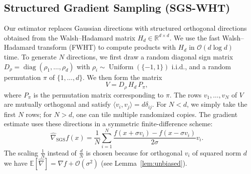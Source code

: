 \documentclass[11pt,a4paper]{article}
\begin{document}
\subsection{Structured Gradient Sampling (SGS-WHT)}
Our estimator replaces Gaussian directions with structured orthogonal directions obtained from the Walsh–Hadamard matrix $H_d \in \mathbb{R}^{d \times d}$. We use the fast Walsh–Hadamard transform (FWHT) to compute products with $H_d$ in $\mathcal{O}(d \log d)$ time. To generate $N$ directions, we first draw a random diagonal sign matrix $D_\rho = \operatorname{diag}(\rho_1,\dots,\rho_d)$ with $\rho_i \sim \operatorname{Uniform}(\{-1,1\})$ i.i.d., and a random permutation $\pi$ of $\{1,\dots,d\}$. We then form the matrix
\begin{equation}
    V = D_\rho \, H_d \, P_\pi,
\end{equation}
where $P_\pi$ is the permutation matrix corresponding to $\pi$. The rows $v_1,\dots,v_N$ of $V$ are mutually orthogonal and satisfy $\langle v_i, v_j \rangle = d \delta_{ij}$. For $N < d$, we simply take the first $N$ rows; for $N > d$, one can tile multiple randomized copies. The gradient estimate uses these directions in a symmetric finite-difference scheme:
\begin{equation} \label{eq:estimator}
    \hat{\nabla}_{\text{SGS}} f(x) = \frac{1}{N} \sum_{i=1}^N \frac{f(x + \sigma v_i) - f(x - \sigma v_i)}{2\sigma} v_i .
\end{equation}
The scaling $\frac{1}{N}$ instead of $\frac{d}{N}$ is chosen because for orthogonal $v_i$ of squared norm $d$ we have $\mathbb{E}[\hat{\nabla}] = \nabla f + \mathcal{O}(\sigma^2)$ (see Lemma~\ref{lem:unbiased}).
\end{document}
